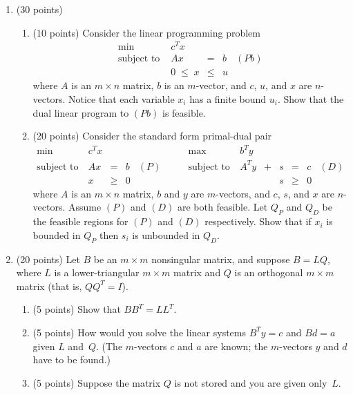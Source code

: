 \documentclass[12pt]{article}
\begin{document}
\begin{enumerate}
  \item (30 points)
\begin{enumerate}
\item (10 points)
Consider the linear programming problem
\begin{displaymath}
\begin{array}{lrclr}
\min & c^Tx \\
\mbox{subject to } & Ax & = & b & (Pb) \\
& 0 \; \leq \;  x & \leq & u
\end{array}
\end{displaymath}
where $A$ is an $m \times n$ matrix,
$b$ is an $m$-vector,
and $c$, $u$, and $x$ are $n$-vectors.
Notice that each variable $x_i$ has a finite bound $u_i$.
Show that the dual linear program to $(Pb)$ is feasible.
\item (20 points)
Consider the standard form primal-dual pair
\begin{displaymath}
\begin{array}{lrclrlrcrclr}
\min & c^Tx &&&& \max & b^Ty \\
\mbox{subject to } & Ax & = & b & (P) \qquad & \mbox{subject to } & A^Ty & + & s & = & c & (D) \\
& x & \geq & 0 &&&&& s & \geq & 0
\end{array}
\end{displaymath}
where $A$ is an $m \times n$ matrix,
$b$ and $y$ are $m$-vectors,
and $c$, $s$, and $x$ are $n$-vectors.
Assume $(P)$ and $(D)$ are both feasible.
Let $Q_P$ and $Q_D$ be the feasible regions for $(P)$ and $(D)$ respectively.
Show that if $x_i$ is bounded in $Q_P$ then $s_i$ is unbounded in $Q_D$.
\end{enumerate}
  \item  (20 points)
    Let $B$ be an $m \times m$ nonsingular matrix, and suppose $B=LQ$,
    where $L$ is a lower-triangular $m \times m$ matrix and $Q$ is an
    orthogonal $m \times m$ matrix (that is, $QQ^T=I$).
    \begin{enumerate}
      \item (5 points) Show that $BB^T=LL^T$.
      \item (5 points)
        How would you solve the linear systems $B^Ty=c$ and $Bd=a$ given
        $L$ and~$Q$. (The $m$-vectors $c$ and $a$ are known; the $m$-vectors
        $y$ and $d$ have to be found.)
      \item (5 points)
        Suppose the matrix $Q$ is not stored and you are given only~$L$.

\end{enumerate}
\end{enumerate}
\end{document}
